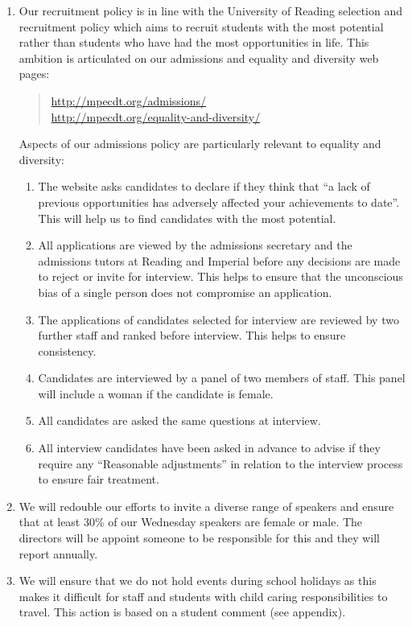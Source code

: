 \documentclass[12pt]{article}
\begin{document}
\begin{enumerate}
\item Our recruitment policy is in line with the University of Reading selection and recruitment policy which aims to recruit students with the most potential rather than students who have had the most opportunities in life. This ambition is articulated on our admissions and equality and diversity web pages:
\begin{quote}
\url{http://mpecdt.org/admissions/} \\
\url{http://mpecdt.org/equality-and-diversity/}
\end{quote}
Aspects of our admissions policy are particularly relevant to equality and diversity:
\begin{enumerate}
\item The website asks candidates to declare if they think that ``a lack of previous opportunities has adversely affected your achievements to date''. This will help us to find candidates with the most potential.
\item All applications are viewed by the admissions secretary and the admissions tutors at Reading and Imperial before any decisions are made to reject or invite for interview. This helps to ensure that the unconscious bias of a single person does not compromise an application. 
\item The applications of candidates selected for interview are reviewed by two further staff and ranked before interview. This helps to ensure consistency.
\item Candidates are interviewed by a panel of two members of staff. This panel will include a woman if the candidate is female. 
\item All candidates are asked the same questions at interview.
\item All interview candidates have been asked in advance to advise if they require any ``Reasonable adjustments'' in relation to the interview process to ensure fair treatment.
\end{enumerate}

\item We will redouble our efforts to invite a diverse range of speakers and ensure that at least 30\% of our Wednesday speakers are female or male. The directors will be appoint someone to be responsible for this and they will report annually.

\item We will ensure that we do not hold events during school holidays as this makes it difficult for staff and students with child caring responsibilities to travel. This action is based on a student comment (see appendix).


\end{enumerate}
\end{document}
